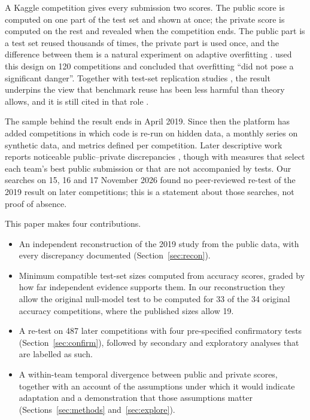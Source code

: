 \documentclass[10pt]{article}
\begin{document}
A Kaggle competition gives every submission two scores. The public score is computed on one part of the test set and shown at once; the private score is computed on the rest and revealed when the competition ends. The public part is a test set reused thousands of times, the private part is used once, and the difference between them is a natural experiment on adaptive overfitting \citep{dwork2015reusable,blum2015ladder}. \citet{roelofs2019meta} used this design on 120 competitions and concluded that overfitting ``did not pose a significant danger''. Together with test-set replication studies \citep{recht2019imagenet,yadav2019cold}, the result underpins the view that benchmark reuse has been less harmful than theory allows, and it is still cited in that role \citep{sculley2025position}.

The sample behind the result ends in April 2019. Since then the platform has added competitions in which code is re-run on hidden data, a monthly series on synthetic data, and metrics defined per competition. Later descriptive work reports noticeable public--private discrepancies \citep{bonisch2025chronicles,burtch2026monoculture}, though with measures that select each team's best public submission or that are not accompanied by tests. Our searches on 15, 16 and 17 November 2026 found no peer-reviewed re-test of the 2019 result on later competitions; this is a statement about those searches, not proof of absence.

This paper makes four contributions.
\begin{itemize}
\item An independent reconstruction of the 2019 study from the public data, with every discrepancy documented (Section~\ref{sec:recon}).
\item Minimum compatible test-set sizes computed from accuracy scores, graded by how far independent evidence supports them. In our reconstruction they allow the original null-model test to be computed for 33 of the 34 original accuracy competitions, where the published sizes allow 19.
\item A re-test on 487 later competitions with four pre-specified confirmatory tests (Section~\ref{sec:confirm}), followed by secondary and exploratory analyses that are labelled as such.
\item A within-team temporal divergence between public and private scores, together with an account of the assumptions under which it would indicate adaptation and a demonstration that those assumptions matter (Sections~\ref{sec:methods} and~\ref{sec:explore}).
\end{itemize}
\end{document}
